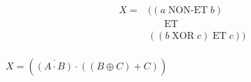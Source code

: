 \documentclass[11pt,a4paper]{article}
\begin{document}
\vspace*{-0.5cm}


\begin{equation*}
    \begin{split}
X = & ((a \; \text{NON-ET} \; b) \\
    &   \; \; \; \; \; \; \text{ET} \\
    & ((b \; \text{XOR} \; c) \; \text{ET} \; c)) \\
    \end{split}
\end{equation*}

$ X = (\overline{(A \cdot B)} \cdot ( (B \oplus C) + C )) $

\bigskip
\end{document}
